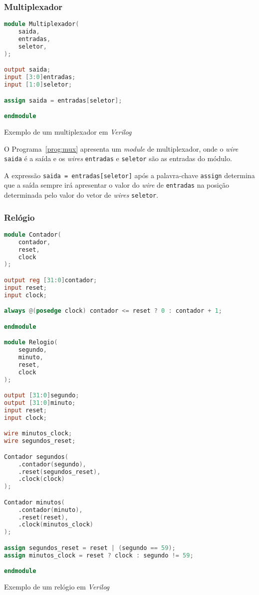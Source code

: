 \subsubsection{Multiplexador}
\label{ssec:mux}

\begin{program}
  \centering

\begin{lstlisting}[language=Verilog, style=wider]
module Multiplexador(
    saida,
    entradas,
    seletor,
);

output saida;
input [3:0]entradas;
input [1:0]seletor;

assign saida = entradas[seletor];

endmodule
\end{lstlisting}

  \caption{Exemplo de um multiplexador em \emph{Verilog}\label{prog:mux}}
\end{program}

O Programa~\ref{prog:mux} apresenta um \emph{module} de multiplexador,
onde o \emph{wire} \texttt{saida} é a saída e os \emph{wires}
\texttt{entradas} e \texttt{seletor} são as entradas do módulo.

A expressão \texttt{saida = entradas[seletor]} após a palavra-chave
\texttt{assign} determina que a saída sempre irá apresentar o valor do
\emph{wire} de \texttt{entradas} na posição determinada pelo valor 
do vetor de \emph{wires} \texttt{seletor}.

\subsubsection{Relógio}
\label{ssec:clock}

\begin{program}
  \centering

\begin{lstlisting}[language=Verilog, style=wider]
module Contador(
    contador,
    reset,
    clock
);

output reg [31:0]contador;
input reset;
input clock;

always @(posedge clock) contador <= reset ? 0 : contador + 1;

endmodule

module Relogio(
    segundo,
    minuto,
    reset,
    clock
);

output [31:0]segundo;
output [31:0]minuto;
input reset;
input clock;

wire minutos_clock;
wire segundos_reset;

Contador segundos(
    .contador(segundo),
    .reset(segundos_reset),
    .clock(clock)
);

Contador minutos(
    .contador(minuto),
    .reset(reset),
    .clock(minutos_clock)
);

assign segundos_reset = reset | (segundo == 59);
assign minutos_clock = reset ? clock : segundo != 59;

endmodule
\end{lstlisting}

  \caption{Exemplo de um relógio em \emph{Verilog}\label{prog:clock}}
\end{program}

